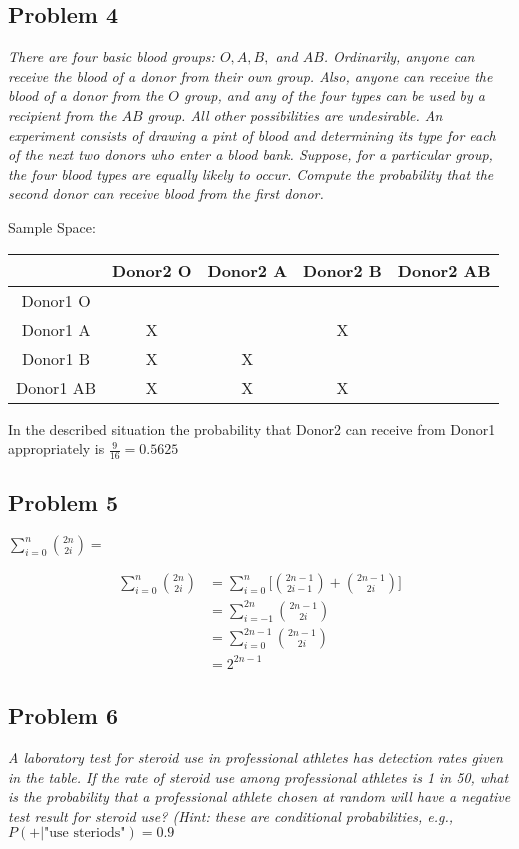 \documentclass[a4paper,man,natbib]{apa6}
\begin{document}
\subsection{Problem 4}
\emph{There are four basic blood groups: $O, A, B,$ and $AB$. 
	Ordinarily, anyone can receive the blood of a donor from their own group. Also, anyone can receive the blood of a donor from the $O$ group, and any of the four types can be used by a recipient from the $AB$ group. All other possibilities are undesirable. An experiment consists of drawing a pint of blood and determining its type for each of the next two donors who enter a blood bank. Suppose, for a particular group, the four blood types are equally likely to occur. Compute the probability that the second donor can receive blood from the first donor.} \vspace{1em}

Sample Space: \\
\begin{tabular}{|c|c|c|c|c|}
	\hline
	& Donor2 O & Donor2 A & Donor2 B & Donor2 AB \\
	\hline Donor1 O   & \checkmark &  \checkmark & \checkmark  & \checkmark \\
	\hline Donor1 A   & X & \checkmark  & X & \checkmark \\
	\hline Donor1 B   & X & X & \checkmark  & \checkmark  \\
	\hline Donor1 AB & X  & X & X &  \checkmark  \\
	\hline
\end{tabular}

	In the described situation the probability that Donor2 can receive from Donor1 appropriately is
	$\frac{9}{16} = 0.5625$

\subsection{Problem 5}
\emph{  $\sum_{i=0}^{n} \binom{2n}{2i} =$  }\vspace{1em}

\begin{align*}
	\sum_{i=0}^{n}\binom{2n}{2i}
	&= \sum_{i=0}^{n}\bigg[ \binom{2n-1}{2i-1}+\binom{2n-1}{2i} \bigg] \\
	&= \sum_{i=-1}^{2n}\binom{2n-1}{2i}  \\
	&= \sum_{i=0}^{2n-1}\binom{2n-1}{2i}  \\
	&= 2^{2n-1}
\end{align*}

\subsection{Problem 6}
\emph{A laboratory test for steroid use in professional athletes has detection rates given in the table.
	If the rate of steroid use among professional athletes is 1 in 50, what is the probability that a professional athlete chosen at random will have a negative test result for steroid use? (Hint: these are conditional probabilities, e.g.,} 
	$P(+|  \text{"use steriods"} )=0.9$
	
\end{document}
